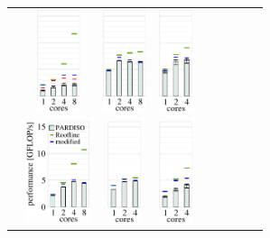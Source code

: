 \begin{tabular}{lcccccccc}
  & 
  \includegraphics[height=3.0cm,clip=true]{images/perf/p-80/p-knightmare1-n-40-b-4}%
  & 
  \includegraphics[height=3.0cm,clip=true]{images/perf/p-80/p-summitridge1-n-40-b-4}%
  & 
  \includegraphics[height=3.0cm,clip=true]{images/perf/p-80/p-naples1-n-40-b-4}%
%
\\
 \raisebox{1.70cm}{\rotatebox[origin=c]{90}{lapl2}} &
  \includegraphics[height=3.0cm,clip=true]{images/perf/p-80/p-emmy-n-70-b-1}%
  & 
  \includegraphics[height=3.0cm,clip=true]{images/perf/p-80/p-woody-hsw-n-70-b-1}%
  & 
  \includegraphics[height=3.0cm,clip=true]{images/perf/p-80/p-hasep1-n-70-b-1}%

\end{tabular}
